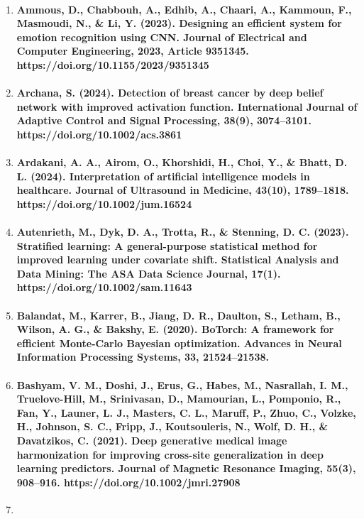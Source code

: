 \begin{enumerate}
\def\labelenumi{\arabic{enumi}.}
\item
  \paragraph{Ammous, D., Chabbouh, A., Edhib, A., Chaari, A., Kammoun, F., Masmoudi, N., \& Li, Y. (2023). Designing an efficient system for emotion recognition using CNN. Journal of Electrical and Computer Engineering, 2023, Article 9351345. https://doi.org/10.1155/2023/9351345}
\item
  \paragraph{Archana, S. (2024). Detection of breast cancer by deep belief network with improved activation function. International Journal of Adaptive Control and Signal Processing, 38(9), 3074–3101. https://doi.org/10.1002/acs.3861}
\item
  \paragraph{Ardakani, A. A., Airom, O., Khorshidi, H., Choi, Y., \& Bhatt, D. L. (2024). Interpretation of artificial intelligence models in healthcare. Journal of Ultrasound in Medicine, 43(10), 1789–1818. https://doi.org/10.1002/jum.16524}
\item
  \paragraph{Autenrieth, M., Dyk, D. A., Trotta, R., \& Stenning, D. C. (2023). Stratified learning: A general-purpose statistical method for improved learning under covariate shift. Statistical Analysis and Data Mining: The ASA Data Science Journal, 17(1). https://doi.org/10.1002/sam.11643}
\item
  \paragraph{Balandat, M., Karrer, B., Jiang, D. R., Daulton, S., Letham, B., Wilson, A. G., \& Bakshy, E. (2020). BoTorch: A framework for efficient Monte-Carlo Bayesian optimization. Advances in Neural Information Processing Systems, 33, 21524–21538.}
\item
  \paragraph{Bashyam, V. M., Doshi, J., Erus, G., Habes, M., Nasrallah, I. M., Truelove-Hill, M., Srinivasan, D., Mamourian, L., Pomponio, R., Fan, Y., Launer, L. J., Masters, C. L., Maruff, P., Zhuo, C., Volzke, H., Johnson, S. C., Fripp, J., Koutsouleris, N., Wolf, D. H., \& Davatzikos, C. (2021). Deep generative medical image harmonization for improving cross-site generalization in deep learning predictors. Journal of Magnetic Resonance Imaging, 55(3), 908–916. https://doi.org/10.1002/jmri.27908}
\item

\end{enumerate}

